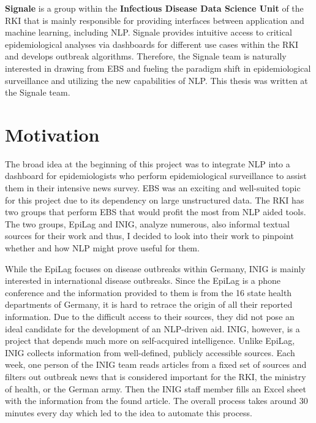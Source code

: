   \textbf{Signale} is a group within the \textbf{Infectious Disease Data Science Unit} of the RKI that is mainly responsible for providing interfaces between application and machine learning, including NLP.
  Signale provides intuitive access to critical epidemiological analyses via dashboards for different use cases within the RKI and develops outbreak algorithms.
  Therefore, the Signale team is naturally interested in drawing from EBS and fueling the paradigm shift in epidemiological surveillance and utilizing the new capabilities of NLP.
  This thesis was written at the Signale team.

\section{Motivation}
  The broad idea at the beginning of this project was to integrate NLP into a dashboard for epidemiologists who perform epidemiological surveillance to assist them in their intensive news survey.
  EBS was an exciting and well-suited topic for this project due to its dependency on large unstructured data.
  The RKI has two groups that perform EBS that would profit the most from NLP aided tools. The two groups, EpiLag and INIG, analyze numerous, also informal textual sources for their work and thus, I decided to look into their work to pinpoint whether and how NLP might prove useful for them.

  While the EpiLag focuses on disease outbreaks within Germany, INIG is mainly interested in international disease outbreaks. Since the EpiLag is a phone conference and the information provided to them is from the 16 state health departments of Germany, it is hard to retrace the origin of all their reported information.
  Due to the difficult access to their sources, they did not pose an ideal candidate for the development of an NLP-driven aid.
  INIG, however, is a project that depends much more on self-acquired intelligence.
  Unlike EpiLag, INIG collects information from well-defined, publicly accessible sources.
  Each week, one person of the INIG team reads articles from a fixed set of sources and filters out outbreak news that is considered important for the RKI, the ministry of health, or the German army.
  Then the INIG staff member fills an Excel sheet with the information from the found article.
  The overall process takes around 30 minutes every day which led to the idea to automate this process.

